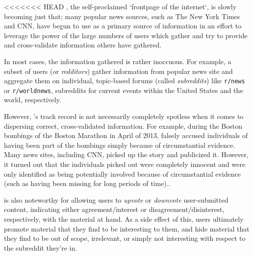 <<<<<<< HEAD
\reddit{}, the self-proclaimed `frontpage of the internet`, is slowly becoming
just that; many popular news sources, such as The New York Times and CNN, have
begun to use \reddit{} as a primary source of information in an effort to
leverage the power of the large numbers of users which gather and try to provide
and cross-validate information others have gathered.

In most cases, the information gathered is rather inoccuous. For example, a
subset of \reddit{} users (or \textit{redditors}) gather information from
popular news site and aggregate them on individual, topic-based forums (called
\textit{subreddits}) like \texttt{r/news} or \texttt{r/worldnews}, subreddits
for current events within the United States and the world, respectively.

However, \reddit{}'s track record is not necessarily completely spotless when it
comes to dispersing correct, cross-validated information. For example, during
the Boston bombings of the Boston Marathon in April of 2013, \reddit{} falsely
accused individuals of having been part of the bombings simply because of
circumstantial evidence. Many news sites, including CNN, picked up the story and
publicized it. However, it turned out that the individuals \reddit{} picked out
were completely innocent and were only identified as being potentially involved
because of circumstantial evidence (such as having been missing for long periods
of time).\cite{Potts:2013:IRC:2507065.2507079}.

\reddit{} is also noteworthy for allowing users to \textit{upvote} or
\textit{downvote} user-submitted content, indicating either agreement/interest
or disagreement/disinterest, respectively, with the material at hand. As a side
effect of this, users ultimately promote material that they find to be
interesting to them, and hide material that they find to be out of scope,
irrelevant, or simply not interesting with respect to the subreddit they're in.\cite{Gilbert:2013:WUR:2441776.2441866}
